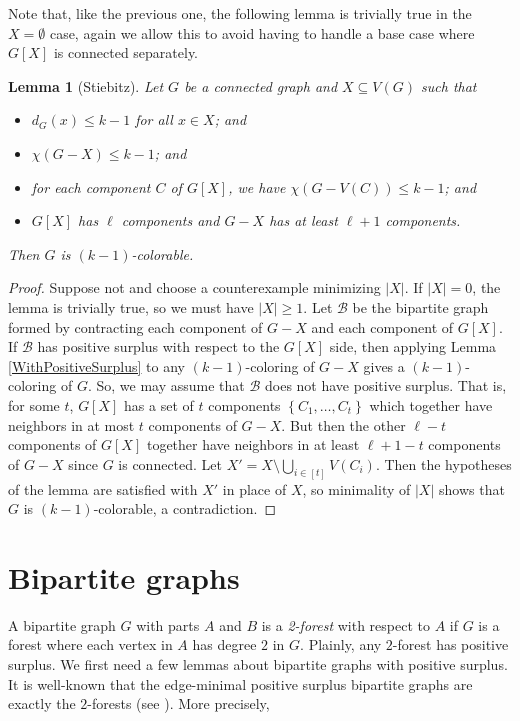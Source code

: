 \documentclass[12pt]{article}
\theoremstyle{plain}
\newtheorem{lem}[thm]{Lemma}
\theoremstyle{definition}
\theoremstyle{remark}
\newcommand{\fancy}[1]{\mathcal{#1}}
\newcommand{\B}{\fancy{B}}
\newcommand{\set}[1]{\left\{ #1 \right\}}
\newcommand{\irange}[1]{\left[#1\right]}
\begin{document}
Note that, like the previous one, the following lemma is trivially true in the $X = \emptyset$ case, again we allow this to avoid having to handle a base case where $G[X]$ is connected separately.
\begin{lem}[Stiebitz]
Let $G$ be a connected graph and $X \subseteq V(G)$ such that
\begin{itemize}
\item $d_G(x) \le k - 1$ for all $x \in X$; and
\item $\chi(G-X) \le k-1$; and
\item for each component $C$ of $G[X]$, we have $\chi(G - V(C)) \le k - 1$; and
\item $G[X]$ has $\ell$ components and $G-X$ has at least $\ell + 1$ components.
\end{itemize}
Then $G$ is $(k-1)$-colorable.
\label{MainLemma}
\end{lem}
\begin{proof}
Suppose not and choose a counterexample minimizing $|X|$.  If $|X| = 0$, the lemma is trivially true, so we must have $|X| \ge 1$.
Let $\B$ be the bipartite graph formed by contracting each component of $G-X$ and each component of $G[X]$.  If $\B$ has positive surplus with respect to the $G[X]$ side, then applying Lemma \ref{WithPositiveSurplus} to any $(k-1)$-coloring of $G-X$ gives a $(k-1)$-coloring of $G$.  So, we may assume that $\B$ does not have positive surplus.  That is, for some $t$, $G[X]$ has a set of $t$ components $\set{C_1, \ldots, C_t}$ which together have neighbors in at most $t$ components of $G-X$.  But then the other $\ell - t$ components of $G[X]$ together have neighbors in at least $\ell + 1 - t$ components of $G-X$ since $G$ is connected.  Let $X' = X \setminus \bigcup_{i \in \irange{t}} V(C_i)$.  Then the hypotheses of the lemma are satisfied with $X'$ in place of $X$, so minimality of $|X|$ shows that $G$ is $(k-1)$-colorable, a contradiction.
\end{proof}

\section*{Bipartite graphs}
A bipartite graph $G$ with parts $A$ and $B$ is a \emph{2-forest} with respect to $A$ if $G$ is a forest where each vertex in $A$ has degree $2$ in $G$.  Plainly, any $2$-forest has positive surplus.  We first need a few lemmas about bipartite graphs with positive surplus.  It is well-known that the edge-minimal positive surplus bipartite graphs are exactly the $2$-forests (see \cite{LovaszPlummer)}).  More precisely,
\end{document}
